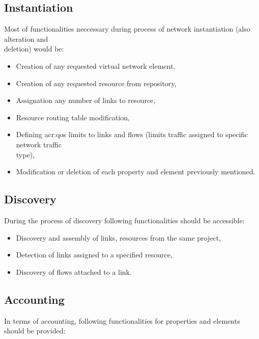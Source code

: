 \documentclass[11pt]{book}
\begin{document}
      \subsection{Instantiation}
		\label{sec:req:func:inst}
	  
		Most of functionalities neccessary during process of network instantiation (also alteration and \\ deletion) would be:
		
		\begin{itemize}
			\item{Creation of any requested virtual network element, }
			\item{Creation of any requested resource from repository, }
			\item{Assignation any number of links to resource, }
			\item{Resource routing table modification, }
			\item{Defining \gls{acr:qos} limits to links and flows (limits traffic assigned to specific network traffic \\ type), }
			\item{Modification or deletion of each property and element previously mentioned. }
		\end{itemize}
		

      \subsection{Discovery}
		\label{sec:req:func:disc}
		
		During the process of discovery following functionalities should be accessible:
		
		\begin{itemize}
			\item{Discovery and assembly of links, resources from the same project, }
			\item{Detection of links assigned to a specified resource, }
			\item{Discovery of flows attached to a link. }
		\end{itemize}


      \subsection{Accounting}  %
		\label{sec:req:func:acc}
		
		In terms of accounting, following functionalities for properties and elements should be provided:
		
\end{document}

